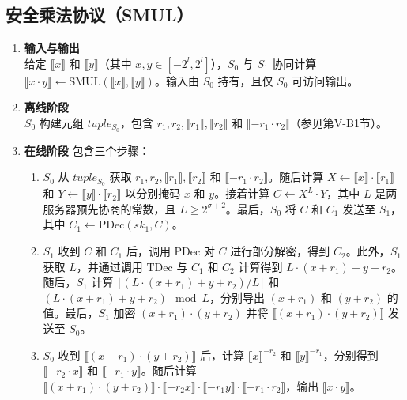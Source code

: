 \subsection{安全乘法协议（SMUL）}
\begin{enumerate}[leftmargin=*, nosep]
    \item \textbf{输入与输出}  \\
    给定 $\llbracket x \rrbracket$ 和 $\llbracket y \rrbracket$（其中 $x, y \in [-2^l, 2^l]$），$S_0$ 与 $S_1$ 协同计算 $\llbracket x \cdot y \rrbracket \leftarrow \text{SMUL}(\llbracket x \rrbracket, \llbracket y \rrbracket)$。输入由 $S_0$ 持有，且仅 $S_0$ 可访问输出。

    \item \textbf{离线阶段}  \\
    $S_0$ 构建元组 $tuple_{S_0}$，包含 $r_1, r_2, \llbracket r_1 \rrbracket, \llbracket r_2 \rrbracket$ 和 $\llbracket -r_1 \cdot r_2 \rrbracket$（参见第V-B1节）。

    \item \textbf{在线阶段}  
    包含三个步骤：
    \begin{enumerate}[leftmargin=*, nosep]
        \item $S_0$ 从 $tuple_{S_0}$ 获取 $r_1, r_2, \llbracket r_1 \rrbracket, \llbracket r_2 \rrbracket$ 和 $\llbracket -r_1 \cdot r_2 \rrbracket$。随后计算 $X \leftarrow \llbracket x \rrbracket \cdot \llbracket r_1 \rrbracket$ 和 $Y \leftarrow \llbracket y \rrbracket \cdot \llbracket r_2 \rrbracket$ 以分别掩码 $x$ 和 $y$。接着计算 $C \leftarrow X^L \cdot Y$，其中 $L$ 是两服务器预先协商的常数，且 $L \geq 2^{\sigma+2}$。最后，$S_0$ 将 $C$ 和 $C_1$ 发送至 $S_1$，其中 $C_1 \leftarrow \text{PDec}(sk_1, C)$。
        \item $S_1$ 收到 $C$ 和 $C_1$ 后，调用 $\text{PDec}$ 对 $C$ 进行部分解密，得到 $C_2$。此外，$S_1$ 获取 $L$，并通过调用 $\text{TDec}$ 与 $C_1$ 和 $C_2$ 计算得到 $L \cdot (x + r_1) + y + r_2$。随后，$S_1$ 计算 $\lfloor (L \cdot (x + r_1) + y + r_2)/L \rfloor$ 和 $(L \cdot (x + r_1) + y + r_2) \mod L$，分别导出 $(x + r_1)$ 和 $(y + r_2)$ 的值。最后，$S_1$ 加密 $(x + r_1) \cdot (y + r_2)$ 并将 $\llbracket (x + r_1) \cdot (y + r_2) \rrbracket$ 发送至 $S_0$。
        \item $S_0$ 收到 $\llbracket (x + r_1) \cdot (y + r_2) \rrbracket$ 后，计算 $\llbracket x \rrbracket^{-r_2}$ 和 $\llbracket y \rrbracket^{-r_1}$，分别得到 $\llbracket -r_2 \cdot x \rrbracket$ 和 $\llbracket -r_1 \cdot y \rrbracket$。随后计算 $\llbracket (x + r_1) \cdot (y + r_2) \rrbracket \cdot \llbracket -r_2 x \rrbracket \cdot \llbracket -r_1 y \rrbracket \cdot \llbracket -r_1 \cdot r_2 \rrbracket$，输出 $\llbracket x \cdot y \rrbracket$。
    \end{enumerate}
\end{enumerate}

